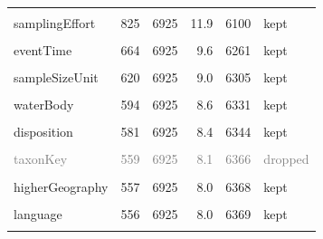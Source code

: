 \documentclass[sn-apa,pdflatex]{sn-jnl}
\begin{document}
\begin{longtable}[t]{lrrrrl}
\cellcolor{gray!10}{institutionCode} & \cellcolor{gray!10}{827} & \cellcolor{gray!10}{6925} & \cellcolor{gray!10}{11.9} & \cellcolor{gray!10}{6098} & \cellcolor{gray!10}{kept}\\
samplingEffort & 825 & 6925 & 11.9 & 6100 & kept\\
\cellcolor{gray!10}{collectionCode} & \cellcolor{gray!10}{817} & \cellcolor{gray!10}{6925} & \cellcolor{gray!10}{11.8} & \cellcolor{gray!10}{6108} & \cellcolor{gray!10}{kept}\\
\addlinespace
eventTime & 664 & 6925 & 9.6 & 6261 & kept\\
\cellcolor{gray!10}{lifeStage} & \cellcolor{gray!10}{634} & \cellcolor{gray!10}{6925} & \cellcolor{gray!10}{9.2} & \cellcolor{gray!10}{6291} & \cellcolor{gray!10}{kept}\\
sampleSizeUnit & 620 & 6925 & 9.0 & 6305 & kept\\
\cellcolor{gray!10}{coordinateUncertaintyInMeters} & \cellcolor{gray!10}{613} & \cellcolor{gray!10}{6925} & \cellcolor{gray!10}{8.9} & \cellcolor{gray!10}{6312} & \cellcolor{gray!10}{kept}\\
waterBody & 594 & 6925 & 8.6 & 6331 & kept\\
\addlinespace
\cellcolor{gray!10}{collectionID} & \cellcolor{gray!10}{592} & \cellcolor{gray!10}{6925} & \cellcolor{gray!10}{8.5} & \cellcolor{gray!10}{6333} & \cellcolor{gray!10}{kept}\\
disposition & 581 & 6925 & 8.4 & 6344 & kept\\
\cellcolor{gray!10}{habitat} & \cellcolor{gray!10}{580} & \cellcolor{gray!10}{6925} & \cellcolor{gray!10}{8.4} & \cellcolor{gray!10}{6345} & \cellcolor{gray!10}{kept}\\
\textcolor{gray}{taxonKey} & \textcolor{gray}{559} & \textcolor{gray}{6925} & \textcolor{gray}{8.1} & \textcolor{gray}{6366} & \textcolor{gray}{dropped}\\
\cellcolor{gray!10}{typeStatus} & \cellcolor{gray!10}{557} & \cellcolor{gray!10}{6925} & \cellcolor{gray!10}{8.0} & \cellcolor{gray!10}{6368} & \cellcolor{gray!10}{kept}\\
\addlinespace
higherGeography & 557 & 6925 & 8.0 & 6368 & kept\\
\cellcolor{gray!10}{fieldNumber} & \cellcolor{gray!10}{557} & \cellcolor{gray!10}{6925} & \cellcolor{gray!10}{8.0} & \cellcolor{gray!10}{6368} & \cellcolor{gray!10}{kept}\\
language & 556 & 6925 & 8.0 & 6369 & kept\\
\cellcolor{gray!10}{modified} & \cellcolor{gray!10}{556} & \cellcolor{gray!10}{6925} & \cellcolor{gray!10}{8.0} & \cellcolor{gray!10}{6369} & \cellcolor{gray!10}{kept}\\

\end{longtable}
\end{document}
